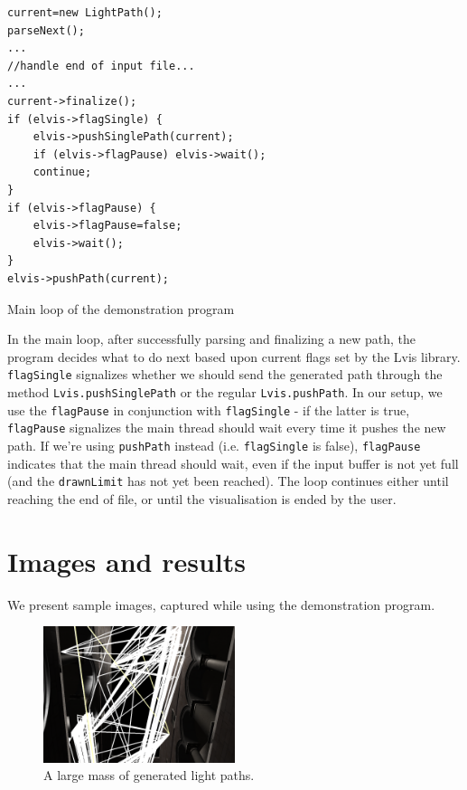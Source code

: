 \begin{listing}
\begin{verbatim}
current=new LightPath();
parseNext();
...
//handle end of input file...
...
current->finalize();
if (elvis->flagSingle) {
	elvis->pushSinglePath(current);
	if (elvis->flagPause) elvis->wait();
	continue;
}
if (elvis->flagPause) {
	elvis->flagPause=false;
	elvis->wait();
}
elvis->pushPath(current);              
\end{verbatim}
\caption{Main loop of the demonstration program}
\label{lst:demo}
\end{listing}

In the main loop, after successfully parsing and finalizing a new path, the program decides what to do next based upon current flags set by the Lvis library. \texttt{flagSingle} signalizes whether we should send the generated path through the method \texttt{Lvis.pushSinglePath} or the regular \texttt{Lvis.pushPath}. In our setup, we use the \texttt{flagPause} in conjunction with \texttt{flagSingle} - if the latter is true, \texttt{flagPause} signalizes the main thread should wait every time it pushes the new path. If we're using \texttt{pushPath} instead (i.e. \texttt{flagSingle} is false), \texttt{flagPause} indicates that the main thread should wait, even if the input buffer is not yet full (and the \texttt{drawnLimit} has not yet been reached). The loop continues either until reaching the end of file, or until the visualisation is ended by the user.

\section{Images and results}

We present sample images, captured while using the demonstration program.

\begin{figure}[h]
    \centering
    \includegraphics[width=0.5\textwidth]{paths.png}
    \caption{A large mass of generated light paths.}
\end{figure}

